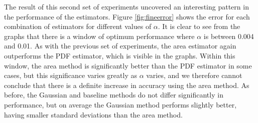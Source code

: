 \documentclass[a4paper,11pt]{article}
\begin{document}
The result of this second set of experiments uncovered an interesting pattern in
the performance of the estimators. Figure \ref{fig:fineerror} shows the error
for each combination of estimators for different values of $\alpha$. It is clear
to see from the graphs that there is a window of optimum performance where
$\alpha$ is between 0.004 and 0.01. As with the previous set of experiments, the
area estimator again outperforms the PDF estimator, which is visible in the
graphs. Within this window, the area method is significantly better than the PDF
estimator in some cases, but this significance varies greatly as $\alpha$
varies, and we therefore cannot conclude that there is a definite increase in
accuracy using the area method. As before, the Gaussian and baseline methods do
not differ significantly in performance, but on average the Gaussian method
performs slightly better, having smaller standard deviations than the area
method.
\end{document}
